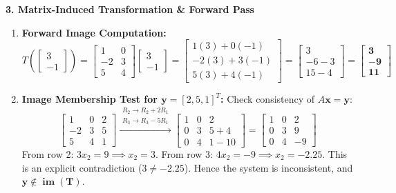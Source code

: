 \textbf{3. Matrix-Induced Transformation \& Forward Pass}
\begin{enumerate}
    \item \textbf{Forward Image Computation:}
    \begin{equation*}
    T\left(\begin{bmatrix} 3 \\ -1 \end{bmatrix}\right) = \begin{bmatrix} 1 & 0 \\ -2 & 3 \\ 5 & 4 \end{bmatrix} \begin{bmatrix} 3 \\ -1 \end{bmatrix} = \begin{bmatrix} 1(3) + 0(-1) \\ -2(3) + 3(-1) \\ 5(3) + 4(-1) \end{bmatrix} = \begin{bmatrix} 3 \\ -6 - 3 \\ 15 - 4 \end{bmatrix} = \mathbf{\begin{bmatrix} 3 \\ -9 \\ 11 \end{bmatrix}}
    \end{equation*}
    \item \textbf{Image Membership Test for $\mathbf{y} = [2, 5, 1]^T$:}
    Check consistency of $A\mathbf{x} = \mathbf{y}$:
    \begin{equation*}
    \left[\begin{array}{cc|c} 1 & 0 & 2 \\ -2 & 3 & 5 \\ 5 & 4 & 1 \end{array}\right] \xrightarrow{\substack{R_2 \to R_2 + 2R_1 \\ R_3 \to R_3 - 5R_1}} \left[\begin{array}{cc|c} 1 & 0 & 2 \\ 0 & 3 & 5 + 4 \\ 0 & 4 & 1 - 10 \end{array}\right] = \left[\begin{array}{cc|c} 1 & 0 & 2 \\ 0 & 3 & 9 \\ 0 & 4 & -9 \end{array}\right]
    \end{equation*}
    From row 2: $3x_2 = 9 \implies x_2 = 3$. From row 3: $4x_2 = -9 \implies x_2 = -2.25$.
    This is an explicit contradiction ($3 \neq -2.25$).
    Hence the system is inconsistent, and $\mathbf{y} \mathbf{\notin \operatorname{im}(T)}$.
\end{enumerate}

